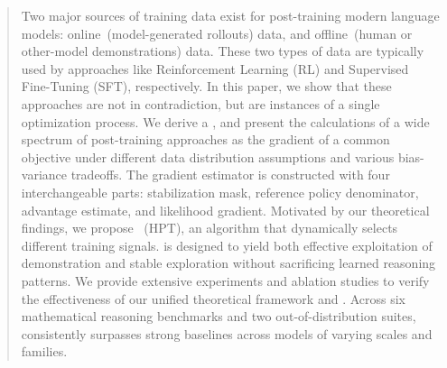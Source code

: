 \begin{abstract}




Two major sources of training data exist for post-training modern language models: online~(model-generated rollouts) data, and offline~(human or other-model demonstrations) data. 
These two types of data are typically used by approaches like Reinforcement Learning (RL) and Supervised Fine-Tuning (SFT), respectively.
In this paper, we show that these approaches are not in contradiction, but are instances of a single optimization process.
We derive a \framework, and present the calculations of a wide spectrum of post-training approaches as the gradient of a common objective under different data distribution assumptions and various bias-variance tradeoffs. The gradient estimator is constructed with four interchangeable parts: stabilization mask, reference policy denominator, advantage estimate, and likelihood gradient. 
Motivated by our theoretical findings, we propose \method~(HPT), an algorithm that dynamically selects different training signals.
\mot is designed to yield both effective exploitation of demonstration and stable exploration without sacrificing learned reasoning patterns.
We provide extensive experiments and ablation studies to verify the effectiveness of our unified theoretical framework and \mot.
Across six mathematical reasoning benchmarks and two out-of-distribution suites, \mot consistently surpasses strong baselines across models of varying scales and families.





\end{abstract}
